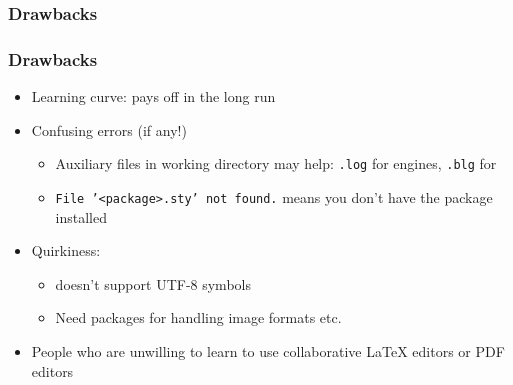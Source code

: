 \documentclass[xetex,colorlinks]{beamer} %
\begin{document}
  \subsubsection{Drawbacks}
  \begin{frame}
    \frametitle{Drawbacks}
    \begin{itemize}
     \item Learning curve: pays off in the long run
     \item Confusing errors (if any!)
     \begin{itemize}
      \item Auxiliary files in working directory may help: \texttt{.log} for engines, \texttt{.blg} for 
      \item \texttt{File '<package>.sty' not found.} means you don't have the package installed
     \end{itemize}
     \item Quirkiness:
     \begin{itemize}
      \item {} doesn’t support UTF-8 symbols
      \item Need packages for handling image formats etc.
     \end{itemize}
     \item People who are unwilling to learn to use collaborative \LaTeX{} editors or PDF editors
    \end{itemize}
    \centering
    
  \end{frame}
  
\end{document}
